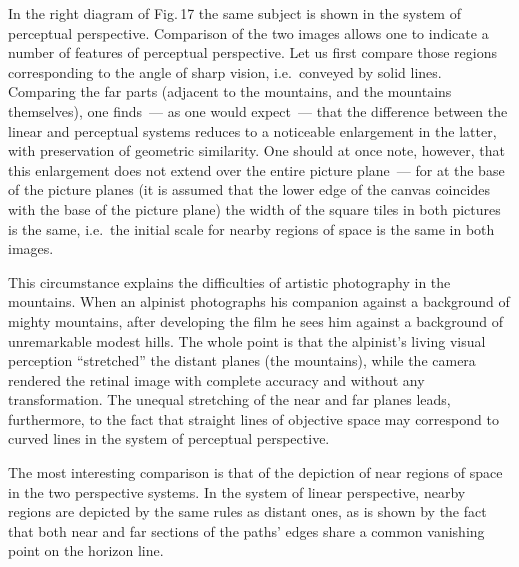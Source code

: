 
In the right diagram of Fig.\,17 the same subject is shown in the system of perceptual
perspective.  Comparison of the two images allows one to indicate a number of features
of perceptual perspective.  Let us first compare those regions corresponding to the angle
of sharp vision, i.e.\ conveyed by solid lines.  Comparing the far parts (adjacent to the
mountains, and the mountains themselves), one finds~--- as one would expect~--- that the
difference between the linear and perceptual systems reduces to a noticeable enlargement
in the latter, with preservation of geometric similarity.  One should at once note,
however, that this enlargement does not extend over the entire picture plane~--- for at
the base of the picture planes (it is assumed that the lower edge of the canvas coincides
with the base of the picture plane) the width of the square tiles in both pictures is the
same, i.e.\ the initial scale for nearby regions of space is the same in both images.

This circumstance explains the difficulties of artistic photography in the mountains.
When an alpinist photographs his companion against a background of mighty mountains,
after developing the film he sees him against a background of unremarkable modest
hills.  The whole point is that the alpinist's living visual perception ``stretched'' the
distant planes (the mountains), while the camera rendered the retinal image with
complete accuracy and without any transformation.  The unequal stretching of the near
and far planes leads, furthermore, to the fact that straight lines of objective space may
correspond to curved lines in the system of perceptual perspective.

The most interesting comparison is that of the depiction of near regions of space in the
two perspective systems.  In the system of linear perspective, nearby regions are depicted
by the same rules as distant ones, as is shown by the fact that both near and far sections
of the paths' edges share a common vanishing point on the horizon line.

